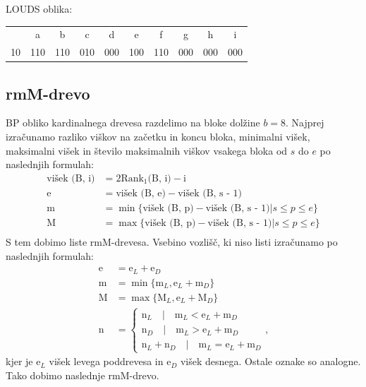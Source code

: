 \documentclass{article}
\begin{document}
\noindent
LOUDS oblika: {}
\begin{table}[htbp]
    \centering
    \begin{tabular}{|c|c|c|c|c|c|c|c|c|c|}
        \hline
        & a & b & c & d & e & f & g & h & i \\
        10 & 110 & 110 & 010 & 000 & 100 & 110 & 000 & 000 & 000 \\
        \hline
    \end{tabular}
\end{table}

\subsection*{rmM-drevo}
BP obliko kardinalnega drevesa razdelimo na bloke dolžine $b = 8$.
Najprej izračunamo razliko viškov na začetku in koncu bloka, minimalni višek, maksimalni višek in število maksimalnih viškov vsakega bloka od $s$ do $e$ po naslednjih formulah:
\begin{align*}
    \text{višek (B, i)} &= 2 \text{Rank}_1 \text{(B, i)} - \text{i} \\ 
    \text{e} &= \text{višek (B, e)} - \text{višek (B, s - 1)} \\
    \text{m} &= \min \{ \text{višek (B, p)} - \text{višek (B, s - 1)} | s \leq p \leq e \} \\
    \text{M} &= \max \{ \text{višek (B, p)} - \text{višek (B, s - 1)} | s \leq p \leq e \} \\
\end{align*}
S tem dobimo liste rmM-drevesa. Vsebino vozlišč, ki niso listi izračunamo po naslednjih formulah:
\begin{align*}
    \text{e} &= \text{e}_L + \text{e}_D \\
    \text{m} &= \min \{ \text{m}_L, \text{e}_L + \text{m}_D \} \\
    \text{M} &= \max \{ \text{M}_L, \text{e}_L + \text{M}_D \} \\
    \text{n} &=
    \begin{cases}
        \text{n}_L \quad | \quad \text{m}_L < \text{e}_L + \text{m}_D \\
        \text{n}_D \quad | \quad \text{m}_L > \text{e}_L + \text{m}_D \\
        \text{n}_L + \text{n}_D \quad | \quad \text{m}_L = \text{e}_L + \text{m}_D 
    \end{cases}
    \text{,}
\end{align*}
kjer je e$_L$ višek levega poddrevesa in e$_D$ višek desnega. Ostale oznake so analogne. Tako dobimo naslednje rmM-drevo.
\end{document}
